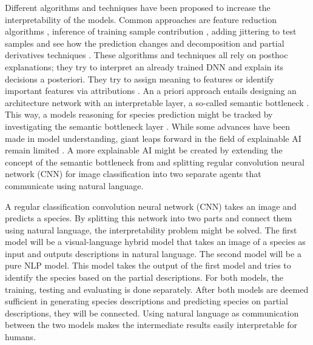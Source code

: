 \documentclass[a4paper, 12pt, oneside]{book} %
\begin{document}
Different algorithms and techniques have been proposed to increase the interpretability of the models.
Common approaches are feature reduction algorithms \autocite{ribeiro_why_2016}, inference of training sample contribution \autocite{koh_understanding_2020}, adding jittering to test samples and see how the prediction changes \autocite{li_understanding_2017} and decomposition and partial derivatives techniques \autocite{samek_explainable_2017}.
These algorithms and techniques all rely on posthoc explanations; they try to interpret an already trained DNN and explain its decisions a posteriori.
They try to assign meaning to features \autocite{fleet_visualizing_2014} or identify important features via attributions \autocite{zintgraf_visualizing_2017, selvaraju_grad-cam_2017}.
An a priori approach entails designing an architecture network with an interpretable layer, a so-called semantic bottleneck \autocite{bucher_semantic_2019}. 
This way, a models reasoning for species prediction might be tracked by investigating the semantic bottleneck layer \autocite{ishikawa_contextual_2021, losch_interpretability_2019}.
While some advances have been made in model understanding, giant leaps forward in the field of explainable AI remain limited \autocite{lipton_mythos_2017, li_interpretable_2021}.
A more explainable AI might be created by extending the concept of the semantic bottleneck from \textcite{ishikawa_contextual_2021} and splitting regular convolution neural network (CNN) for image classification into two separate agents that communicate using natural language.

A regular classification convolution neural network (CNN) takes an image and predicts a species.
By splitting this network into two parts and connect them using natural language, the interpretability problem might be solved.
The first model will be a visual-language hybrid model that takes an image of a species as input and outputs descriptions in natural language.
The second model will be a pure NLP model.
This model takes the output of the first model and tries to identify the species based on the partial descriptions.
For both models, the training, testing and evaluating is done separately. 
After both models are deemed sufficient in generating species descriptions and predicting species on partial descriptions, they will be connected.
Using natural language as communication between the two models makes the intermediate results easily interpretable for humans.
\end{document}
